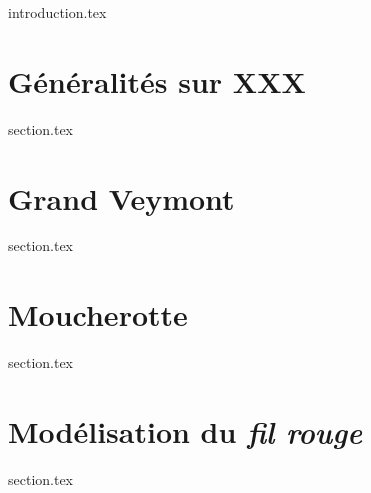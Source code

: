 
\chaptertoc{}

{introduction.tex}

\section{Généralités sur XXX}
\label{sec:9-1}
{section.tex}

\section{Grand Veymont}
\label{sec:9-2}
{section.tex}

\section{Moucherotte}
\label{sec:9-3}
{section.tex}

\section{Modélisation du \emph{fil rouge}}
\label{sec:9-4}
{section.tex}




